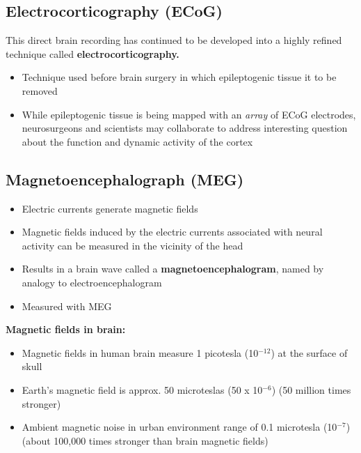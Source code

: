 \documentclass{article}
\begin{document}
\subsection{Electrocorticography (ECoG)}
This direct brain recording has continued to be developed into a highly refined technique called \textbf{electrocorticography.} 

\begin{itemize}
    \item Technique used before brain surgery in which epileptogenic tissue it to be removed 
    \item While epileptogenic tissue is being mapped with an \textit{array} of ECoG electrodes, neurosurgeons and scientists may collaborate to address interesting question about the function and dynamic activity of the cortex
\end{itemize}

\subsection{Magnetoencephalograph (MEG)}
\begin{itemize}
    \item Electric currents generate magnetic fields
    \item Magnetic fields induced by the electric currents associated with neural activity can be measured in the vicinity of the head
    \item Results in a brain wave called a \textbf{magnetoencephalogram}, named by analogy to electroencephalogram
    \item Measured with MEG
\end{itemize}

\noindent \textbf{Magnetic fields in brain:} 
\begin{itemize}
    \item Magnetic fields in human brain measure 1 picotesla (10$^{-12}$) at the surface of skull
    \item Earth's magnetic field is approx. 50 microteslas (50 x 10$^{-6}$) (50 million times stronger)
    \item Ambient magnetic noise in urban environment range of 0.1 microtesla (10$^{-7}$) (about 100,000 times stronger than brain magnetic fields) 
\end{itemize}
\end{document}
